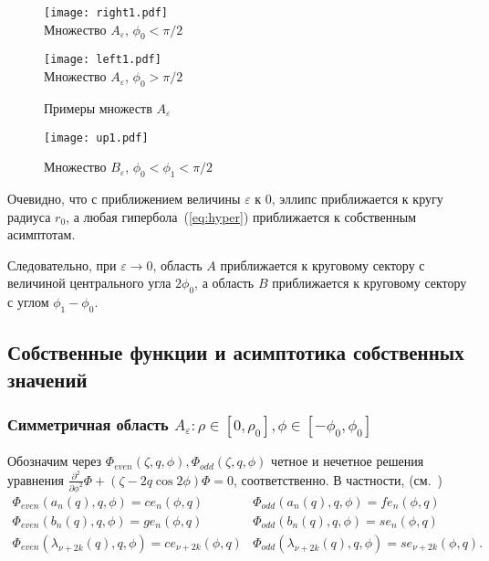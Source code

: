 \begin{figure}[ht]
    \begin{minipage}[b][][b]{0.49\linewidth}\centering
        \texttt{[image: right1.pdf]} \\ 
        Множество $A_\varepsilon$, $\phi_0<\pi/2$
    \end{minipage}
    \hfill
    \begin{minipage}[b][][b]{0.49\linewidth}\centering
        \texttt{[image: left1.pdf]} \\ 
        Множество $A_\varepsilon$, $\phi_0>\pi/2$
    \end{minipage}
\caption{Примеры множеств $A_\varepsilon$}
\end{figure}

\begin{figure}[ht]
\begin{minipage}{0.9\linewidth}\centering
        \texttt{[image: up1.pdf]}  
    \end{minipage}
\caption{        Множество $B_\varepsilon$, $\phi_0<\phi_1<\pi/2$}
\end{figure}

Очевидно, что с приближением величины $\varepsilon$ к 0, эллипс приближается к кругу радиуса $r_0$,
а любая гипербола~(\ref{eq:hyper}) приближается к собственным асимптотам.

Следовательно, при $\varepsilon\to 0$, область $A$ приближается к круговому сектору с величиной центрального угла $2\phi_0$, 
а область  $B$ приближается к круговому сектору с углом $\phi_1-\phi_0$. 


\subsection{Собственные функции и асимптотика собственных значений}\label{sec:ch2/sec2/sub2}
\subsubsection{Симметричная область $A_\varepsilon: \rho \in [0,\rho_0], \phi \in [-\phi_0,\phi_0]$}\label{sec:ch2/sec2/sub2/sub1}

Обозначим через $\Phi_{even}(\zeta, q, \phi), \Phi_{odd}(\zeta, q, \phi)$ четное и нечетное решения уравнения $\frac{\partial^2}{\partial \phi^2}\Phi + (\zeta - 2q\cos{2\phi})\Phi = 0$, соответственно. 
В частности, (см.~\cite{wref2})
\[
\begin{array}{ll}
    \Phi_{even}(a_n(q), q, \phi) = ce_n(\phi, q)	&
    \Phi_{odd}(a_n(q), q, \phi) = fe_n(\phi, q)\\
    \Phi_{even}(b_n(q), q, \phi) = ge_n(\phi, q)	&
    \Phi_{odd}(b_n(q), q, \phi) = se_n(\phi, q)\\
    \Phi_{even}(\lambda_{\nu+2k}(q), q, \phi) = ce_{\nu+2k}(\phi, q) 	&
    \Phi_{odd}(\lambda_{\nu+2k}(q), q, \phi) = se_{\nu+2k}(\phi, q).
\end{array}
\]

